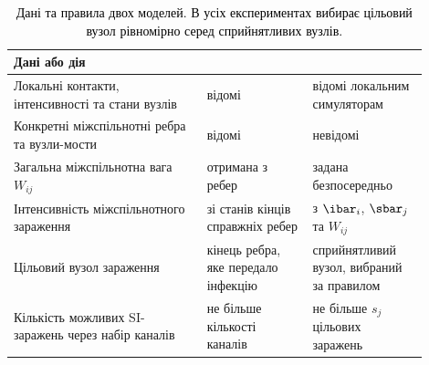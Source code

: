 \begin{table}[tbp]
\color{black}\centering
\caption{\textcolor{black}{Дані та правила двох моделей. В усіх експериментах \TS{} вибирає цільовий вузол рівномірно серед сприйнятливих вузлів.}}
\label{tab:information}
\small
\begin{tabular}{>{\raggedright\arraybackslash}p{0.42\linewidth}>{\raggedright\arraybackslash}p{0.23\linewidth}>{\raggedright\arraybackslash}p{0.25\linewidth}}
\toprule
Дані або дія & \Full{} & \TS{}\\
\midrule
Локальні контакти, інтенсивності та стани вузлів & відомі & відомі локальним симуляторам\\
Конкретні міжспільнотні ребра та вузли-мости & відомі & невідомі\\
Загальна міжспільнотна вага $W_{ij}$ & отримана з ребер & задана безпосередньо\\
Інтенсивність міжспільнотного зараження & зі станів кінців справжніх ребер & з $\ibar_i$, $\sbar_j$ та $W_{ij}$\\
Цільовий вузол зараження & кінець ребра, яке передало інфекцію & сприйнятливий вузол, вибраний за правилом\\
Кількість можливих SI-заражень через набір каналів & не більше кількості каналів & не більше $s_j$ цільових заражень\\
\bottomrule
\end{tabular}
\end{table}

